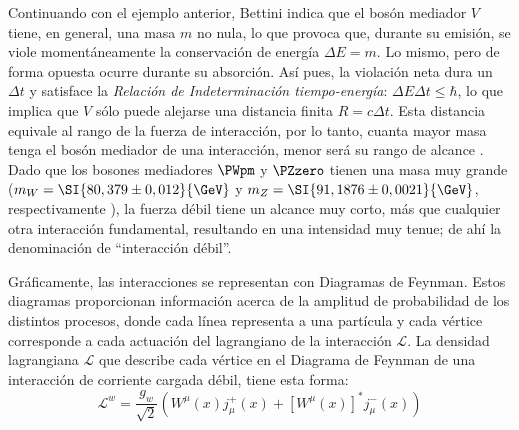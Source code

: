 Continuando con el ejemplo anterior, Bettini indica que el bosón mediador $V$ tiene, en general, una masa $m$ no nula, lo que provoca que, durante su emisión, se viole momentáneamente la conservación de energía $\Delta E = m$. Lo mismo, pero de forma opuesta ocurre durante su absorción. Así pues, la violación neta dura un $\Delta t$ y satisface la \textit{Relación de Indeterminación tiempo-energía}: $\Delta E \Delta t \leq \hbar$, lo que implica que $V$ sólo puede alejarse una distancia finita $R=c\Delta t$. Esta distancia equivale al rango de la fuerza de interacción, por lo tanto, cuanta mayor masa tenga el bosón mediador de una interacción, menor será su rango de alcance \cite{Bettini}. Dado que los bosones mediadores $\PWpm$ y $\PZzero$ tienen una masa muy grande ($m_W = \SI{80,379 \pm 0,012}{\GeV}$ y $m_Z = \SI{91,1876 \pm 0,0021}{\GeV}$, respectivamente \cite{Zyla}), la fuerza débil tiene un alcance muy corto, más que cualquier otra interacción fundamental, resultando en una intensidad muy tenue; de ahí la denominación de ``interacción débil''. 

Gráficamente, las interacciones se representan con Diagramas de Feynman. Estos diagramas proporcionan información acerca de la amplitud de probabilidad de los distintos procesos, donde cada línea representa a una partícula y cada vértice corresponde a cada actuación del lagrangiano de la interacción $\mathcal{L}$. La densidad lagrangiana $\mathcal{L}$ que describe cada vértice en el Diagrama de Feynman de una interacción de corriente cargada débil, tiene esta forma:
\begin{equation}
\mathcal{L}^{w}=\dfrac{g_{w}}{\sqrt{2}}\left( W^{\mu }\left( x\right) j_{\mu}^{+}\left( x\right) +\left[ W^{\mu }\left( x\right) \right]^{\ast }j_{\mu}^{-}\left( x\right) \right)\label{eq:weak_lagrangian}
\end{equation}

